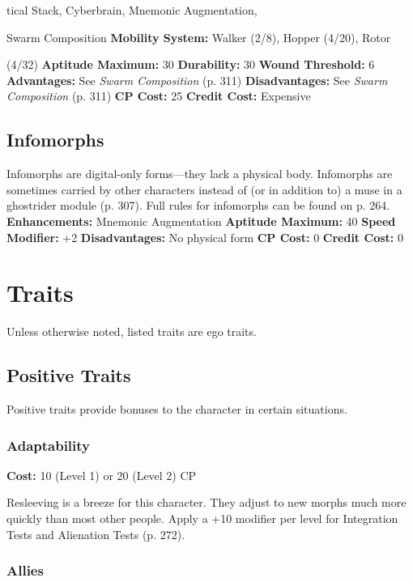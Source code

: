 tical Stack, Cyberbrain, Mnemonic Augmentation, 

Swarm Composition
\textbf{Mobility System:} Walker (2/8), Hopper (4/20), Rotor 

(4/32)
\textbf{Aptitude Maximum: }30
\textbf{Durability:} 30
\textbf{Wound Threshold: }6
\textbf{Advantages: }See \textit{Swarm Composition} (p. 311)
\textbf{Disadvantages: }See \textit{Swarm Composition} (p. 311)
\textbf{CP Cost: }25
\textbf{Credit Cost: }Expensive

\subsection{Infomorphs}

Infomorphs are digital-only forms—they lack a physical
body. Infomorphs are sometimes carried by other
characters instead of (or in addition to) a muse in a 
ghostrider module (p. 307). Full rules for infomorphs 
can be found on p. 264.
\textbf{Enhancements: }Mnemonic Augmentation
\textbf{Aptitude Maximum: }40
\textbf{Speed Modifier:} +2
\textbf{Disadvantages: }No physical form
\textbf{CP Cost: }0
\textbf{Credit Cost: }0

\section{Traits}

Unless otherwise noted, listed traits are ego traits.

\subsection{Positive Traits}

Positive traits provide bonuses to the character in 
certain situations.

\subsubsection{Adaptability}

\textbf{Cost:} 10 (Level 1) or 20 (Level 2) CP

Resleeving is a breeze for this character. They adjust 
to new morphs much more quickly than most other 
people. Apply a +10 modifier per level for Integration 
Tests and Alienation Tests (p. 272).

\subsubsection{Allies}

